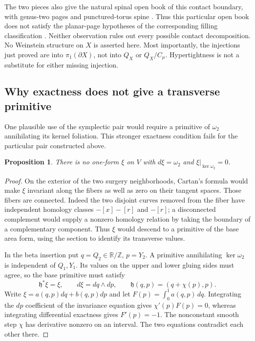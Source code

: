 \documentclass[11pt]{amsart}
\newtheorem{proposition}[theorem]{Proposition}
\theoremstyle{definition}
\theoremstyle{remark}
\newcommand{\Z}{\mathbb Z}
\begin{document}
The two pieces also give the natural spinal open book of this contact
boundary, with genus-two pages and punctured-torus spine
\cite{LVW19}. Thus this particular open book does not satisfy the
planar-page hypotheses of the corresponding filling classification
\cite{LVW20}. Neither observation rules out every possible contact
decomposition. No Weinstein structure on $X$ is asserted here.
Most importantly, the injections just proved are into
$\pi_1(\partial X)$, not into $Q_X$ or $Q_X/C_\mu$.
Hypertightness is not a substitute for either missing injection.

\subsection{Why exactness does not give a transverse primitive}

One plausible use of the symplectic pair would require a primitive of
$\omega_2$ annihilating its kernel foliation. This stronger exactness
condition fails for the particular pair constructed above.

\begin{proposition}\label{prop:basic}
There is no one-form $\xi$ on $V$ with $d\xi=\omega_2$ and
$\xi|_{\ker\omega_2}=0$.
\end{proposition}
\begin{proof}
On the exterior of the two surgery neighborhoods, Cartan's formula
would make $\xi$ invariant along the fibers as well as zero on their
tangent spaces. Those fibers are connected. Indeed the two disjoint
curves removed from the fiber have independent homology classes
$-[x]-[r]$ and $-[r]$; a disconnected complement would supply a
nonzero homology relation by taking the boundary of a complementary
component. Thus $\xi$ would descend to a primitive of the base area
form, using the section to identify its transverse values.

In the beta insertion put $q=Q_2\in\mathbb R/\Z$, $p=Y_2$.
A primitive annihilating $\ker\omega_2$ is independent of $Q_1,Y_1$.
Its values on the upper and lower gluing sides must agree, so the
base primitive must satisfy
\[
 \mathfrak h^*\xi=\xi,\qquad d\xi=dq\wedge dp,
 \qquad \mathfrak h(q,p)=(q+\chi(p),p).
\]
Write $\xi=a(q,p)dq+b(q,p)dp$ and let
$F(p)=\int_0^1a(q,p)\,dq$. Integrating the $dp$ coefficient of
the invariance equation gives $\chi'(p)F(p)=0$, whereas integrating
differential exactness gives $F'(p)=-1$. The nonconstant smooth step
$\chi$ has derivative nonzero on an interval. The two equations
contradict each other there.
\end{proof}
\end{document}
